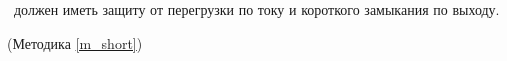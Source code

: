 \dut \ должен иметь защиту от перегрузки по току и короткого замыкания по выходу.

\begin{flushright}
(Методика \ref{m_short})
\end{flushright}